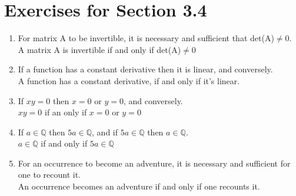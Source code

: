 \documentclass[12pt]{article}
\begin{document}
\section*{Exercises for Section 3.4}
\begin{enumerate}
	\item For matrix A to be invertible, it is necessary and sufficient that det(A)$\neq 0$.\\
	    A matrix A is invertible if and only if det(A)$\neq 0$
	\item If a function has a constant derivative then it is linear, and conversely.\\
	    A function has a constant derivative, if and only if it's linear.
	\item If $xy=0$ then $x=0$ or $y=0$, and conversely.\\
	    $xy=0$ if an only if $x=0$ or $y=0$
	\item If $a \in \mathbb{Q}$ then $5a\in\mathbb{Q}$, and if $5a\in\mathbb{Q}$ then $a\in\mathbb{Q}$.\\
	    $a\in \mathbb{Q}$ if and only if $5a\in \mathbb{Q}$
	\item For an occurrence to become an adventure, it is necessary and sufficient for one to recount it.\\
	    An occurrence becomes an adventure if and only if one recounts it.
\end{enumerate}
\end{document}
